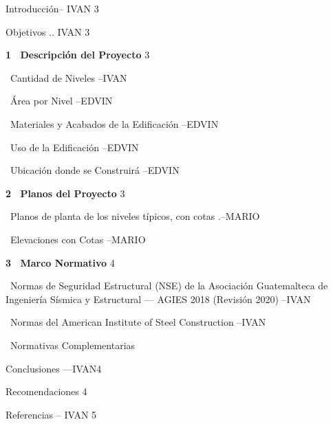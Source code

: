 \documentclass[12pt]{article}
\begin{document}
	
	\noindent Introducción-- IVAN \hfill 3
	
	\noindent Objetivos .. IVAN \hfill 3
	
	\vspace{0.4cm}
	
	\noindent \textbf{1 \ Descripción del Proyecto } \hfill 3
	
	 \ Cantidad de Niveles --IVAN 
	
	 \ Área por Nivel --EDVIN 
	
	 \ Materiales y Acabados de la Edificación  --EDVIN
	
	 \ Uso de la Edificación --EDVIN 
	
	 \ Ubicación donde se Construirá --EDVIN 
	
	\vspace{0.4cm}
	
	\noindent \textbf{2 \ Planos del Proyecto} \hfill 3
	
	 \ Planos de planta de los niveles típicos, con cotas .--MARIO 
	
	 \ Elevaciones con Cotas --MARIO 
	
	\vspace{0.4cm}
	
	\noindent \textbf{3 \ Marco Normativo} \hfill 4
	
	 \ Normas de Seguridad Estructural (NSE) de la Asociación Guatemalteca de Ingeniería Sísmica y Estructural — AGIES 2018 (Revisión 2020) --IVAN 
	
	 \ Normas del American Institute of Steel Construction --IVAN 
	
	 \ Normativas Complementarias 
	
	\vspace{0.4cm}
	
	\noindent Conclusiones ---IVAN\hfill 4
	
	\noindent Recomendaciones \hfill 4
	
	\vspace{0.4cm}
	
	\noindent Referencias -- IVAN \hfill 5
	
\end{document}
